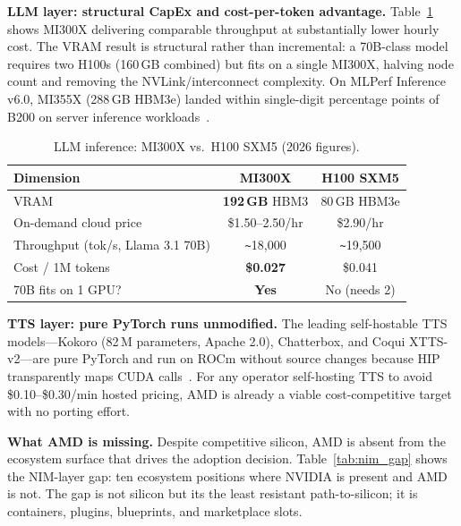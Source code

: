 \documentclass[blind]{gtac}
\begin{document}
\textbf{LLM layer: structural CapEx and cost-per-token advantage.}
Table~\ref{tab:llm} shows MI300X delivering comparable throughput at substantially lower hourly cost. The VRAM result is structural rather than incremental: a 70B-class model requires two H100s (160\,GB combined) but fits on a single MI300X, halving node count and removing the NVLink/interconnect complexity. On MLPerf Inference v6.0, MI355X (288\,GB HBM3e) landed within single-digit percentage points of B200 on server inference workloads~\cite{mlperf6}.

\begin{table}[H]
\centering
\caption{LLM inference: MI300X vs.\ H100 SXM5 (2026 figures).}
\label{tab:llm}
\tiny
\begin{tabular}{@{}lcc@{}}
\toprule
Dimension & MI300X & H100 SXM5 \\
\midrule
VRAM & \textbf{192\,GB} HBM3 & 80\,GB HBM3e \\
On-demand cloud price & \$1.50--2.50/hr & \$2.90/hr \\
Throughput (tok/s, Llama 3.1 70B) & \texttt{\textasciitilde}18{,}000 & \texttt{\textasciitilde}19{,}500 \\
Cost / 1M tokens & \textbf{\$0.027} & \$0.041 \\
70B fits on 1 GPU? & \textbf{Yes} & No (needs 2) \\
\bottomrule
\end{tabular}
\end{table}

\textbf{TTS layer: pure PyTorch runs unmodified.}
The leading self-hostable TTS models---Kokoro (82\,M parameters, Apache 2.0), Chatterbox, and Coqui XTTS-v2---are pure PyTorch and run on ROCm without source changes because HIP transparently maps CUDA calls~\cite{bentoml_tts}. For any operator self-hosting TTS to avoid \$0.10--\$0.30/min hosted pricing, AMD is already a viable cost-competitive target with no porting effort.

\textbf{What AMD is missing.}
Despite competitive silicon, AMD is absent from the ecosystem surface that drives the adoption decision. Table~\ref{tab:nim_gap} shows the NIM-layer gap: ten ecosystem positions where NVIDIA is present and AMD is not. The gap is not silicon but its the least resistant path-to-silicon; it is containers, plugins, blueprints, and marketplace slots.
\end{document}
